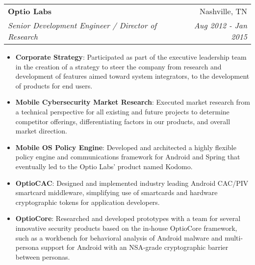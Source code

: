 \documentclass[letterpaper,10pt]{article}
\makeatletter
\newcommand{\resumeItem}[2]{
  \item\small{
    \textbf{#1}{: #2 \vspace{-2pt}}
  }
}
\newcommand{\resumeSubheading}[4]{
  \vspace{-1pt}\item
    \begin{tabular*}{0.97\textwidth}{l@{\extracolsep{\fill}}r}
      \textbf{#1} & #2 \\
      \textit{\small#3} & \textit{\small #4} \\
    \end{tabular*}\vspace{-5pt}
}
\newcommand{\resumeItemListStart}{\begin{itemize}}
\newcommand{\resumeItemListEnd}{\end{itemize}\vspace{-5pt}}
\makeatother
\begin{document}
    \resumeSubheading
      {Optio Labs}{Nashville, TN}
      {Senior Development Engineer / Director of Research}{Aug 2012 - Jan 2015}
      \resumeItemListStart
        \resumeItem{Corporate Strategy}
          {Participated as part of the executive leadership team in the creation of a strategy to steer the company from research and development of features aimed toward system integrators, to the development of products for end users.}
        \resumeItem{Mobile Cybersecurity Market Research}
          {Executed market research from a technical perspective for all existing and future projects to determine competitor offerings, differentiating factors in our products, and overall market direction.}
        \resumeItem{Mobile OS Policy Engine}
          {Developed and architected a highly flexible policy engine and communications framework for Android and Spring that eventually led to the Optio Labs’ product named Kodomo.}
        \resumeItem{OptioCAC}
          {Designed and implemented industry leading Android CAC/PIV smartcard middleware, simplifying use of smartcards and hardware cryptographic tokens for application developers.}
        \resumeItem{OptioCore}
          {Researched and developed prototypes with a team for several innovative security products based on the in-house OptioCore framework, such as a workbench for behavioral analysis of Android malware and multi-persona support for Android with an NSA-grade cryptographic barrier between personas.}
      \resumeItemListEnd
      
      
\end{document}
